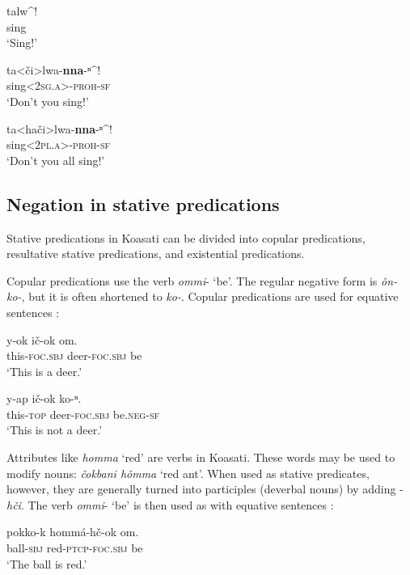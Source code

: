 \documentclass[output=paper,colorlinks,citecolor=brown]{langscibook}
\begin{document}
\ea\label{ex:koa:21}
    \gll talw\^{}! \\
         sing \\
    \glt ‘Sing!’
\z

\ea\label{ex:koa:22}
    \gll ta<či>lwa-\textbf{nna}-ⁿ\^{}! \\
         sing<2\textsc{sg.a}>-\textsc{proh}-\textsc{sf} \\
    \glt ‘Don’t you sing!’
\z

\ea\label{ex:koa:23}
    \gll ta<hači>lwa-\textbf{nna}-ⁿ\^{}! \\
         sing<2\textsc{pl.a}>-\textsc{proh}-\textsc{sf} \\
    \glt ‘Don’t you all sing!’
\z

\subsection{Negation in stative predications}\label{sec:koa:2.3}
Stative predications in Koasati can be divided into copular predications, resultative stative predications, and existential predications.

Copular predications use the verb \textit{ommi}- ‘be’. The regular negative form is \textit{ǒn-ko-},  but it is often shortened to \textit{ko-}. Copular predications are used for equative sentences :


\ea\label{ex:koa:24}
    \ea\label{ex:koa:24a}
        \gll y-ok  ič-ok  om. \\ 
             this-\textsc{foc}.\textsc{sbj}  deer-\textsc{foc}.\textsc{sbj}  be \\
        \glt ‘This is a deer.’
    
    \ex\label{ex:koa:24b}
        \gll y-ap  ič-ok  ko-ⁿ. \\
             this-\textsc{top}  deer-\textsc{foc}.\textsc{sbj}  be.\textsc{neg}-\textsc{sf} \\
        \glt ‘This is not a deer.’
    \z
\z 

Attributes like \textit{homma} ‘red’ are verbs in Koasati. These words may be used to modify nouns: \textit{čokbani h\v{o}mma} ‘red ant’. When used as stative predicates, however, they are generally turned into participles (deverbal nouns) by adding -\textit{hči}. The verb \textit{ommi}- ‘be’ is then used as with equative sentences :


\ea\label{ex:koa:25}
    \ea\label{ex:koa:25a}
        \gll pokko-k  hommá-hč-ok  om. \\ 
             ball-\textsc{sbj}  red-\textsc{ptcp}-\textsc{foc}.\textsc{sbj}  be \\
        \glt ‘The ball is red.’
    
\end{document}
